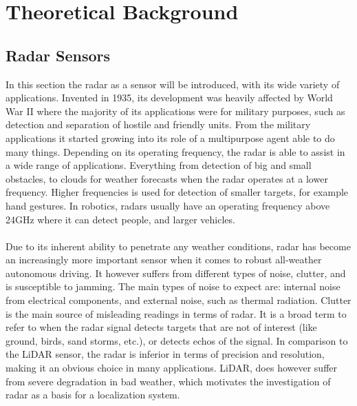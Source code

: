 \chapter{Theoretical Background}
\section{Radar Sensors}
In this section the radar as a sensor will be introduced, with its wide variety of applications. Invented in 1935, its development was heavily affected by World War II where the majority of its applications were for military purposes, such as detection and separation of hostile and friendly units. From the military applications it started growing into its role of a multipurpose agent able to do many things. Depending on its operating frequency, the radar is able to assist in a wide range of applications. Everything from detection of big and small obstacles, to clouds for weather forecasts when the radar operates at a lower frequency. Higher frequencies is used for detection of smaller targets, for example hand gestures.  In robotics, radars usually have an operating frequency above 24GHz where it can detect people, and larger vehicles.
\\\\
Due to its inherent ability to penetrate any weather conditions, radar has become an increasingly more important sensor when it comes to robust all-weather autonomous driving. It however suffers from different types of noise, clutter, and is susceptible to jamming. The main types of noise to expect are: internal noise from electrical components, and external noise, such  as thermal radiation. Clutter is the main source of misleading readings in terms of radar. It is a broad term to refer to when the radar signal detects targets that are not of interest (like ground, birds, sand storms, etc.), or detects echos of the signal. In comparison to the \ac{LiDAR} sensor, the radar is inferior in terms of precision and resolution, making it an obvious choice in many applications. \ac{LiDAR}, does however suffer from severe degradation in bad weather, which motivates the investigation of radar as a basis for a localization system.

